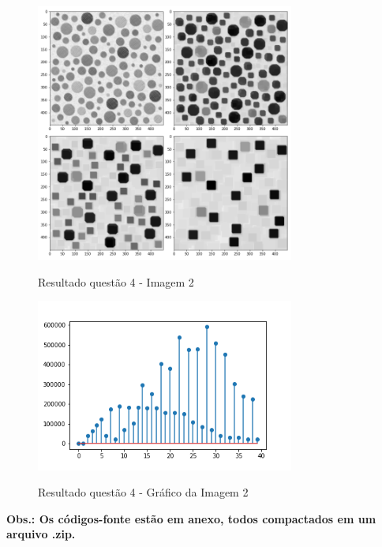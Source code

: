 \documentclass{article}
\begin{document}
\begin{figure}[H]
	\label{fig: q4_2}
	\begin{minipage}[b]{1.0\linewidth}
		\centering
		\centerline{\includegraphics[width=8.5cm]{Figures/result4_2}}
		\centerline{Resultado questão 4 - Imagem 2}\medskip	
	\end{minipage}
\end{figure}

\begin{figure}[H]
	\label{fig: q4_2_graph}
	\begin{minipage}[b]{1.0\linewidth}
		\centering
		\centerline{\includegraphics[width=8.5cm]{Figures/result4_2_graph}}
		\centerline{Resultado questão 4 - Gráfico da Imagem 2}\medskip	
	\end{minipage}
\end{figure}

\textbf{Obs.: Os códigos-fonte estão em anexo, todos compactados em um arquivo .zip.}
\end{document}
